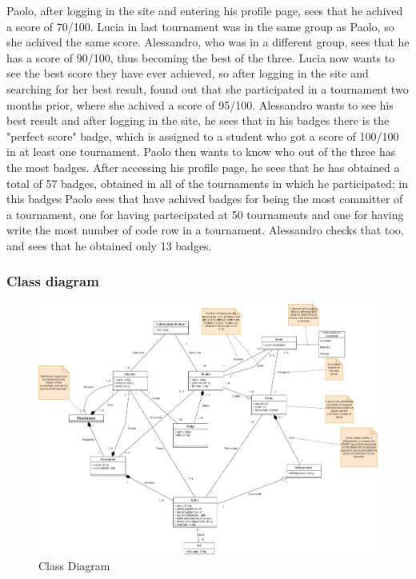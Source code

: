\documentclass{article}
\begin{document}
{Paolo, after logging in the site and entering his profile page, sees that he achived a score of 70/100. Lucia in last tournament was in the same group as Paolo, so she achived the same score. Alessandro, who was in a different group, sees that he has a score of 90/100, thus becoming the best of the three. Lucia now wants to see the best score they have ever achieved, so after logging in the site and searching for her best result, found out that she participated in a tournament two months prior, where she achived a score of 95/100. Alessandro wants to see his best result and after logging in the site, he sees that in his badges there is the "perfect score" badge, which is assigned to a student who got a score of 100/100 in at least one tournament.
Paolo then wants to know who out of the three has the most badges. After accessing his profile page, he sees that he has obtained a total of 57 badges, obtained in all of the tournaments in which he participated; in this badges Paolo sees that have achived badges for being the most committer of a tournament, one for having partecipated at 50 tournaments and one for having write the most number of code row in a tournament. Alessandro checks that too, and sees that he obtained only 13 badges.
\subsubsection{Class diagram}
\begin{figure}[H]
    \centering
    \hspace*{-4.3cm}\includegraphics[scale=0.38]{images/ClassDiagram/Final.jpg}
    \caption{Class Diagram}
    \label{fig:classDiagram}
\end{figure}

}
\end{document}
